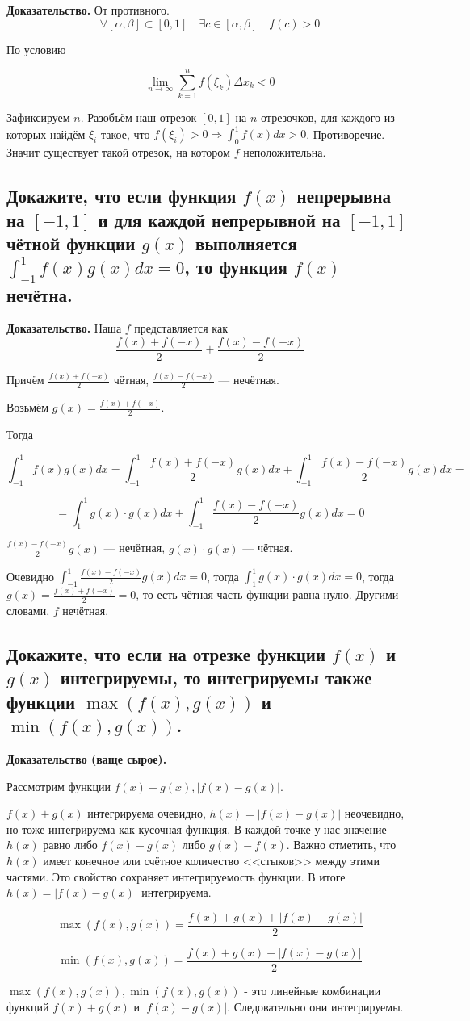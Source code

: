 \documentclass[a4paper]{article}
\begin{document}
\textbf{Доказательство.} От противного. 
\[ \forall [\alpha, \beta] \subset [0,1] \quad \exists c \in [\alpha, \beta] \quad f(c) > 0\]

По условию 

\[ \lim_{n \rightarrow \infty} \sum_{k=1}^n f(\xi_k) \Delta x_k < 0
\]

Зафиксируем $n$. Разобъём наш отрезок $[0,1]$ на $n$ отрезочков, для каждого из которых найдём $\xi_i$ такое, что $f(\xi_i) > 0 \Rightarrow \int_0^1 f(x)dx > 0$. Противоречие. Значит существует такой отрезок, на котором $f$ неположительна.

\subsection{Докажите, что если функция $f(x)$ непрерывна на $[-1,1]$ и для каждой непрерывной на $[-1,1]$ чётной функции $g(x)$ выполняется $\int_{-1}^1 f(x)g(x)dx = 0$, то функция $f(x)$ нечётна.}

\textbf{Доказательство.} Наша $f$ представляется как 
\[
\frac{f(x)+f(-x)}{2} + \frac{f(x)-f(-x)}{2}
\]

Причём $\frac{f(x)+f(-x)}{2}$ чётная, $\frac{f(x)-f(-x)}{2}$ --- нечётная.

Возьмём $g(x) = \frac{f(x)+f(-x)}{2}$.

Тогда 

\[
\int_{-1}^1 f(x)g(x)dx = \int_{-1}^1 \frac{f(x)+f(-x)}{2} g(x) dx + \int_{-1}^1 \frac{f(x)-f(-x)}{2} g(x) dx = 
\]

\[
= \int_1^1 g(x) \cdot g(x) dx + \int_{-1}^1 \frac{f(x)-f(-x)}{2} g(x) dx = 0
\]

$\frac{f(x)-f(-x)}{2} g(x)$ --- нечётная, $g(x)\cdot g(x)$ --- чётная.

Очевидно $\int_{-1}^1 \frac{f(x)-f(-x)}{2} g(x) dx  = 0$, тогда $\int_1^1 g(x)\cdot g(x) dx = 0$, тогда $g(x) = \frac{f(x)+f(-x)}{2} = 0$, то есть чётная часть функции равна нулю. Другими словами, $f$ нечётная.

\subsection{Докажите, что если на отрезке функции $f(x)$ и $g(x)$ интегрируемы, то интегрируемы также функции $\max(f(x), g(x))$ и $\min(f(x), g(x))$.}

\textbf{Доказательство (ваще сырое).} 

Рассмотрим функции $f(x) + g(x), |f(x)-g(x)|$.

$f(x) + g(x)$ интегрируема очевидно, $h(x) = |f(x)-g(x)|$ неочевидно, но тоже интегрируема как кусочная функция. В каждой точке у нас значение $h(x)$ равно либо $f(x)-g(x)$ либо $g(x)-f(x)$. Важно отметить, что $h(x)$ имеет конечное или счётное количество <<стыков>> между этими частями. Это свойство сохраняет интегрируемость функции. В итоге $h(x) = |f(x)-g(x)|$ интегрируема.

\[
\max(f(x),g(x)) = \frac{f(x)+g(x) + |f(x)-g(x)|}{2}
\]

\[
\min(f(x), g(x)) = \frac{f(x)+g(x)-|f(x)-g(x)|}{2}
\]

$\max(f(x),g(x)), \min(f(x), g(x))$ - это линейные комбинации функций $f(x) + g(x)$ и $|f(x)-g(x)|$. Следовательно они интегрируемы.
\end{document}
